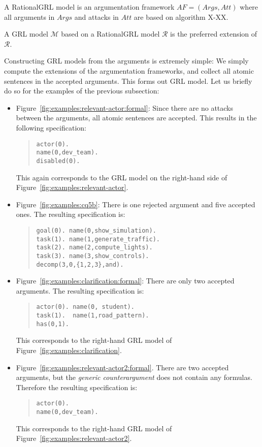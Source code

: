 \begin{definition} A RationalGRL model  is an argumentation framework $AF=(Args,Att)$ where all arguments in $Args$ and attacks in $Att$ are based on algorithm X-XX.  
\end{definition}

\begin{definition} A GRL model $\mathcal{M}$ based on a RationalGRL model $\mathcal{R}$ is the preferred extension of $\mathcal{R}$.  
\end{definition}

Constructing GRL models from the arguments is extremely simple: We simply compute the extensions of the argumentation frameworks, and collect all atomic sentences in the accepted arguments. This forms out GRL model. Let us briefly do so for the examples of the previous subsection:
\begin{itemize}
\item
Figure~\ref{fig:examples:relevant-actor:formal}: Since there are no attacks between the arguments, all atomic sentences are accepted. This results in the following specification: 
\begin{quote}
\begin{verbatim}
actor(0).
name(0,dev_team).
disabled(0).
\end{verbatim}
\end{quote}
This again corresponds to the GRL model on the right-hand side of Figure~\ref{fig:examples:relevant-actor}.
\item
Figure~\ref{fig:examples:cq5b}: There is one rejected argument and five accepted ones. The resulting specification is:
\begin{quote}
\begin{verbatim}
goal(0). name(0,show_simulation).
task(1). name(1,generate_traffic).
task(2). name(2,compute_lights).
task(3). name(3,show_controls).
decomp(3,0,{1,2,3},and).
\end{verbatim}
\end{quote}
\item Figure~\ref{fig:examples:clarification:formal}: There are only two accepted arguments. The resulting specification is:
\begin{quote}
\begin{verbatim}
actor(0). name(0, student).
task(1).  name(1,road_pattern).
has(0,1).
\end{verbatim}
\end{quote}
This corresponds to the right-hand GRL model of Figure~\ref{fig:examples:clarification}.
\item Figure~\ref{fig:examples:relevant-actor2:formal}. There are two accepted arguments, but the \emph{generic counterargument} does not contain any formulas. Therefore the resulting specification is:
\begin{quote}
\begin{verbatim}
actor(0).
name(0,dev_team).
\end{verbatim}
\end{quote}
This corresponds to the right-hand GRL model of Figure~\ref{fig:examples:relevant-actor2}.
\end{itemize}